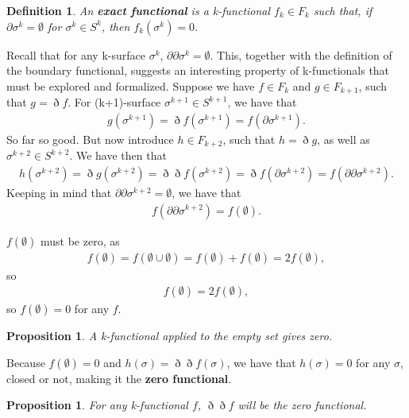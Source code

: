 \documentclass{book}
\newtheorem{defn}[equation]{Definition}
\newtheorem{prop}[equation]{Proposition}
\begin{document}
\begin{defn}
	An \textbf{exact functional} is a k-functional $f_k \in F_k$ such that, if $\partial\sigma^k = \emptyset$ for $\sigma^k \in S^k$, then $f_k(\sigma^k) = 0$. 
\end{defn}

 

Recall that for any k-surface $\sigma^k$, $\partial\partial\sigma^k = \emptyset$. This, together with the definition of the boundary functional, suggests an interesting property of k-functionals that must be explored and formalized. Suppose we have $f \in F_k$ and $g \in F_{k+1}$, such that $g = \eth f$. For (k+1)-surface $\sigma^{k+1} \in S^{k+1}$, we have that \begin{gather} g(\sigma^{k+1}) = \eth f(\sigma^{k+1}) = f(\partial\sigma^{k+1}). \end{gather} So far so good. But now introduce $h \in F_{k+2}$, such that $h = \eth g$, as well as $\sigma^{k+2} \in S^{k+2}$. We have then that \begin{gather} h(\sigma^{k+2}) = \eth g(\sigma^{k+2}) = \eth\eth f(\sigma^{k+2}) = \eth f(\partial\sigma^{k+2}) = f(\partial\partial\sigma^{k+2}). \end{gather} Keeping in mind that $\partial\partial\sigma^{k+2} = \emptyset$, we have that \begin{gather}f(\partial\partial\sigma^{k+2}) = f(\emptyset). \end{gather}

$f(\emptyset)$ must be zero, as \begin{gather} f(\emptyset) = f(\emptyset\cup\emptyset) = f(\emptyset) + f(\emptyset) = 2f(\emptyset),\end{gather} so \begin{gather} f(\emptyset) = 2f(\emptyset), \end{gather} so $f(\emptyset) = 0$ for any $f$. 

\begin{prop}
	A k-functional applied to the empty set gives zero. 
\end{prop}

Because $f(\emptyset) = 0$ and $h(\sigma) = \eth\eth f(\sigma)$, we have that $h(\sigma) = 0$ for any $\sigma$, closed or not, making it the \textbf{zero functional}.

\begin{prop}
	For any k-functional $f$, $\eth\eth f$ will be the zero functional. 
\end{prop}
\end{document}
